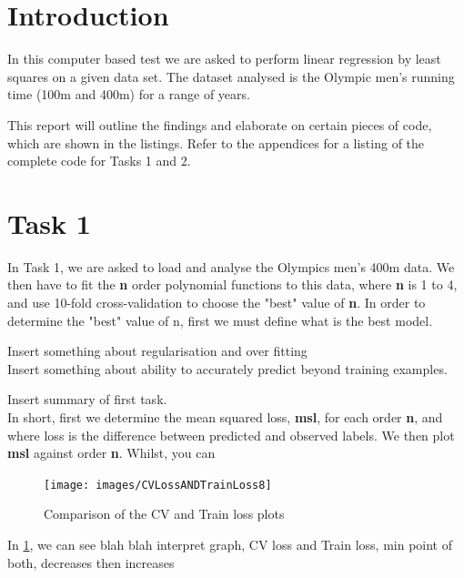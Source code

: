 \section{Introduction}
In this computer based test we are asked to perform linear regression by least squares on a given data set. The dataset analysed is the Olympic men's running time (100m and 400m) for a range of years. 

This report will outline the findings and elaborate on certain pieces of code, which are shown in the listings. Refer to the appendices for a listing of the complete code for Tasks 1 and 2.
\section{Task 1}
In Task 1, we are asked to load and analyse the Olympics men's 400m data. We then have to fit the \textbf{n} order polynomial functions to this data, where \textbf{n} is 1 to 4, and use 10-fold cross-validation to choose the "best" value of \textbf{n}. In order to determine the "best" value of n, first we must define what is the best model. 

Insert something about regularisation and over fitting\\
Insert something about ability to accurately predict beyond training examples.

Insert summary of first task.\\
In short, first we determine the mean squared loss, \textbf{msl}, for each order \textbf{n}, and where loss is the difference between predicted and observed labels. We then plot \textbf{msl} against order \textbf{n}. Whilst, you can 

\begin{figure}[h]
	\centering
	\texttt{[image: images/CVLossANDTrainLoss8]}
	\caption{Comparison of the CV and Train loss plots}
	\label{fig:CVT8}
\end{figure}


In \ref{fig:CVT8}, we can see blah blah interpret graph, CV loss and Train loss, min point of both, decreases then increases

